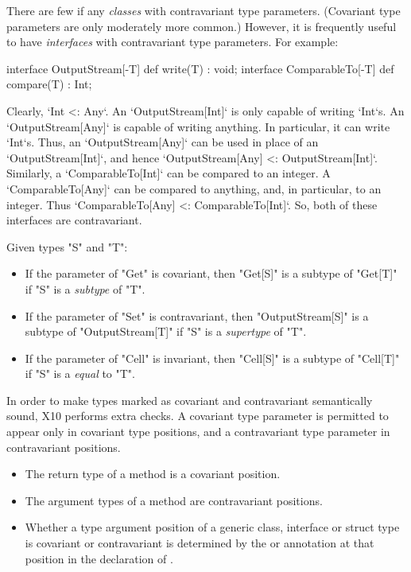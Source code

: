 There are few if any {\em classes} with contravariant type parameters.
(Covariant type parameters are only moderately more common.)  
However, it is frequently useful to have {\em interfaces} with contravariant
type parameters.  For example: 
\begin{xten}
interface OutputStream[-T] {
   def write(T) : void;
}
interface ComparableTo[-T] {
   def compare(T) : Int;
}
\end{xten}
%
Clearly, \xcd`Int <: Any`. 
An \xcd`OutputStream[Int]` is only capable of writing \xcd`Int`s.  
An \xcd`OutputStream[Any]` is capable of writing anything.  In particular, it
can write \xcd`Int`s. Thus, an \xcd`OutputStream[Any]` can be used in place of
an \xcd`OutputStream[Int]`, and hence \xcd`OutputStream[Any] <: OutputStream[Int]`.
Similarly, a \xcd`ComparableTo[Int]` can be compared to an integer. A
\xcd`ComparableTo[Any]` can be compared to anything, and, in particular, to an
integer.  Thus \xcd`ComparableTo[Any] <: ComparableTo[Int]`.
So, both of these interfaces are contravariant.


Given types \xcd"S" and \xcd"T": 
\begin{itemize}
\item
If the parameter of \xcd"Get" is covariant, then
\xcd"Get[S]" is a subtype of \xcd"Get[T]" if
\xcd"S" is a {\em subtype} of \xcd"T".

\item
If the parameter of \xcd"Set" is contravariant, then
\xcd"OutputStream[S]" is a subtype of \xcd"OutputStream[T]" if
\xcd"S" is a {\em supertype} of \xcd"T".

\item
If the parameter of \xcd"Cell" is invariant, then
\xcd"Cell[S]" is a subtype of \xcd"Cell[T]" if
\xcd"S" is a {\em equal} to \xcd"T".
\end{itemize}


In order to make types marked as covariant and contravariant semantically
sound, X10 performs extra checks.  
A covariant type parameter is permitted to appear only in covariant type positions,
and a contravariant type parameter in contravariant positions. 
\begin{itemize}
\item The return type of a method is a covariant position.
\item The argument types of a method are contravariant positions.
\item Whether a type argument position of a generic class, interface or struct type 
is covariant or contravariant is determined by the \Xcd{+} or \Xcd{-} annotation
at that position in the declaration of .
\end{itemize}



